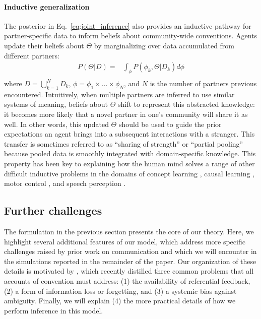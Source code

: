\paragraph{Inductive generalization}

The posterior in Eq.~\ref{eq:joint_inference} also provides an inductive pathway for partner-specific data to inform beliefs about community-wide conventions.
Agents update their beliefs about $\Theta$ by marginalizing over data accumulated from different partners:
\begin{equation}
\begin{split}
    P(\Theta | D)  = & \int_{\phi} P(\phi_k, \Theta | D_k) d\phi \\
\end{split}
\end{equation}
where $D = \bigcup_{k=1}^N D_k$, $\phi = \phi_1 \times \dots \times \phi_N$, and $N$ is the number of partners previous encountered. 
Intuitively, when multiple partners are inferred to use similar systems of meaning, beliefs about $\Theta$ shift to represent this abstracted knowledge: it becomes more likely that a novel partner in one's community will share it as well.
In other words, this updated $\Theta$ should be used to guide the prior expectations an agent brings into a subsequent interactions with a stranger.
This transfer is sometimes referred to as ``sharing of strength'' or ``partial pooling'' because pooled data is smoothly integrated with domain-specific knowledge.
This property has been key to explaining how the human mind solves a range of other difficult inductive problems in the domains of concept learning \cite{KempPerforsTenenbaum07_HBM, tenenbaum_how_2011}, causal learning \cite{KempGoodmanTenenbaum10_LearningToLearn,GoodmanUllmanTenenbaum11_TheoryOfCausality},  motor control \cite{berniker2008estimating}, and speech perception \cite{kleinschmidt2015robust}.

\subsection{Further challenges}

The formulation in the previous section presents the core of our theory.
Here, we highlight several additional features of our model, which address more specific challenges raised by prior work on communication and which we will encounter in the simulations reported in the remainder of the paper. 
Our organization of these details is motivated by , which recently distilled three common problems that all accounts of convention must address: (1) the availability of referential feedback, (2) a form of information loss or forgetting, and (3) a systemic bias against ambiguity.
Finally, we will explain (4) the more practical details of how we perform inference in this model. 

